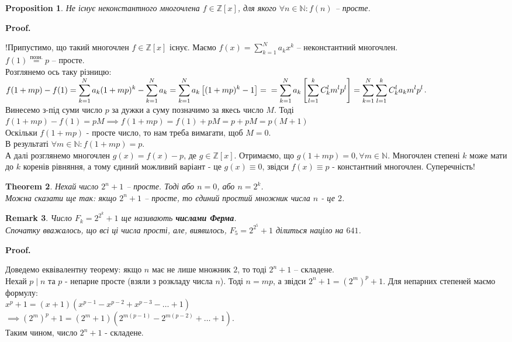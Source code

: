 \documentclass[a4paper, 14pt]{extarticle}
\makeatletter
\theoremstyle{theoremdd}
\newtheorem{theorem}{Theorem}[subsection]
\theoremstyle{theoremdd}
\theoremstyle{theoremdd}
\theoremstyle{theoremdd}
\theoremstyle{theoremdd}
\newtheorem{proposition}[theorem]{Proposition}
\theoremstyle{theoremdd}
\newtheorem{remark}[theorem]{Remark}
\theoremstyle{theoremdd}
\theoremstyle{theoremdd}
\def\qed{$\blacksquare$}
\renewenvironment{proof}[1][Proof.\\]{\par
\pushQED{\hfill \qed}%
\normalfont \topsep6\p@\@plus6\p@\relax
\trivlist
\item\relax
{\bfseries
#1\@addpunct{.}}\hspace\labelsep\ignorespaces
}{%
\popQED\endtrivlist\@endpefalse
}
\makeatother
\begin{document}
\begin{proposition}
Не існує неконстантного многочлена $f \in \mathbb{Z}[x]$, для якого $\forall n \in \mathbb{N}: f(n)$ -- просте.
\end{proposition}

\begin{proof}
!Припустимо, що такий многочлен $f \in \mathbb{Z}[x]$ існує. Маємо $f(x) = \displaystyle\sum_{k=1}^N a_k x^k$ -- неконстантний многочлен.\\
$f(1) \overset{\text{позн.}}{=} p$ -- просте.\\
Розглянемо ось таку різницю:\\
$f(1+mp) - f(1) = \displaystyle\sum_{k=1}^N a_k (1+mp)^k - \sum_{k=1}^N a_k = \sum_{k=1}^N a_k \left[ (1+mp)^k-1 \right] = \\ = \sum_{k=1}^N a_k \left[ \sum_{l=1}^k C_k^l m^l p^l \right] = \sum_{k=1}^N \sum_{l=1}^k C_k^l a_k m^l p^l$.\\
Винесемо з-під суми число $p$ за дужки а суму позначимо за якесь число $M$. Тоді\\
$f(1+mp) - f(1) = pM \implies f(1+mp) = f(1) + pM = p + pM = p(M+1)$\\
Оскільки $f(1+mp)$ - просте число, то нам треба вимагати, щоб $M=0$.\\
В результаті $\forall m \in \mathbb{N}: f(1+mp) = p$.\\
А далі розглянемо многочлен $g(x) = f(x) - p$, де $g \in \mathbb{Z}[x]$. Отримаємо, що $g(1+mp) = 0, \forall m \in \mathbb{N}$. Многочлен степені $k$ може мати до $k$ коренів рівняння, а тому єдиний можливий варіант - це $g(x) \equiv 0$, звідси $f(x) \equiv p$ - константний многочлен. Суперечність!
\end{proof}

\begin{theorem}
Нехай число $2^n+1$ -- просте. Тоді або $n = 0$, або $n = 2^k$.\\
Можна сказати ще так: якщо $2^n+1$ -- просте, то єдиний простий множник числа $n$ - це $2$.
\end{theorem}

\begin{remark}
Число $F_k = 2^{2^k} + 1$ ще називають \textbf{числами Ферма}.\\
Спочатку вважалось, що всі ці числа прості, але, виявилось, $F_5 = 2^{2^5} + 1$ ділиться націло на $641$.
\end{remark}

\begin{proof}
Доведемо еквівалентну теорему: якщо $n$ має не лише множник $2$, то тоді $2^n+1$ -- складене.\\
Нехай $p \mid n$ та $p$ - непарне просте (взяли з розкладу числа $n$). Тоді $n = mp$, а звідси $2^n+1 = (2^m)^p +1$. Для непарних степеней маємо формулу:\\
$x^p + 1 = (x+1)(x^{p-1} - x^{p-2} + x^{p-3} - \dots + 1)$\\
$\implies (2^m)^p + 1 = (2^m+1)(2^{m(p-1)} - 2^{m(p-2)} + \dots + 1)$.\\
Таким чином, число $2^n + 1$ - складене.
\end{proof}
\end{document}
